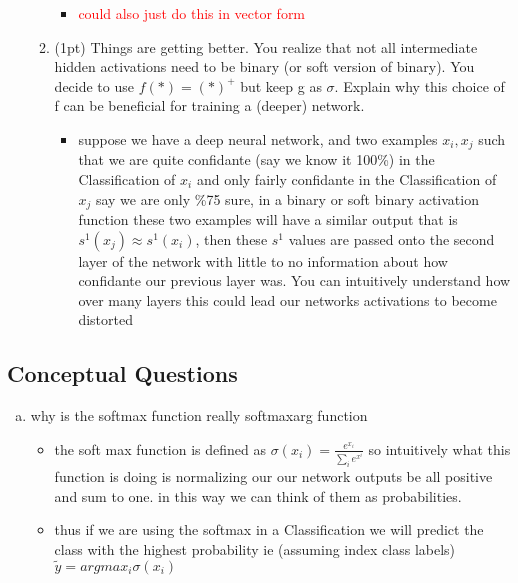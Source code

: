 \documentclass{article}
\begin{document}
\begin{enumerate}[(a)]
\begin{enumerate}
\begin{itemize}
\begin{itemize}
\end{itemize}
\item \textcolor{red}{could also just do this in vector form }
\end{itemize}
\item (1pt) Things are getting better. You realize that not all intermediate hidden activations need to be binary (or soft version of binary). You decide to use $f (*) = (*)^+$ but keep g as $\sigma$. Explain why this choice of f can be beneficial for training a (deeper) network.
\begin{itemize}
    \color{blue}
    \item suppose we have a deep neural network, and two examples $x_i, x_j$ such that we are quite confidante (say we know it 100\%) in the Classification of $x_i$  and only fairly confidante in the Classification of $x_j$ say we are only \%75 sure, in a binary or soft binary activation function these two examples will have a similar output that is $s^1(x_j)\approx s^1({x_i})$, then these $s^{1}$ values are passed onto the second layer of the network with little to no information about how confidante our previous layer was. You can intuitively understand how over many layers this could lead our networks activations to become distorted
\end{itemize}
\end{enumerate}
\end{enumerate}
\subsection{Conceptual Questions}
\begin{enumerate}[(a)]
    \item why is the softmax function really softmaxarg function
    \begin{itemize}
        \color{blue}
        \item the soft max function is defined as $\sigma(x_i)=\frac{e^{x_i}}{\sum_{i}e^{x^{i}}}$ so intuitively what this function is doing is normalizing our our network outputs be all positive and sum to one. in this way we can think of them as probabilities. 
       \item thus if we are using the softmax in a Classification we will predict the class with the highest probability ie (assuming index class labels) $\tilde{y}=argmax_{i}\sigma(x_i)$
    \end{itemize}
    \end{enumerate}
\end{document}

